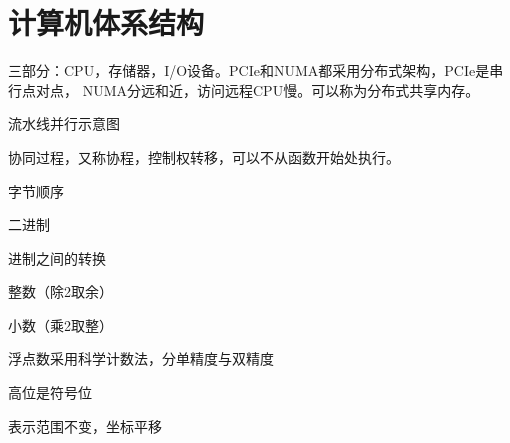 \chapter{计算机体系结构}

三部分：CPU，存储器，I/O设备。PCIe和NUMA都采用分布式架构，PCIe是串行点对点，
NUMA分远和近，访问远程CPU慢。可以称为分布式共享内存。

流水线并行示意图

协同过程，又称协程，控制权转移，可以不从函数开始处执行。

字节顺序

二进制

进制之间的转换
\begin{enumbox}
\item 整数（除2取余）
\item 小数（乘2取整）
\item 浮点数采用科学计数法，分单精度与双精度
\item 高位是符号位
\item 表示范围不变，坐标平移
\end{enumbox}

